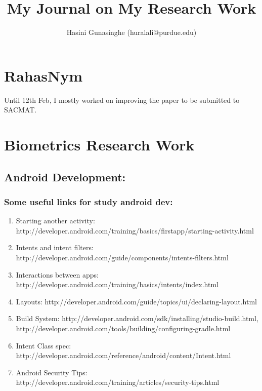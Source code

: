\documentclass[11pt]{article}
\title{
\vspace{-20.mm}
My Journal on My Research Work}
\author{Hasini Gunasinghe (huralali@purdue.edu)}
\date{}
\begin{document}
\maketitle

\section*{RahasNym}
Until 12th Feb, I mostly worked on improving the paper to be submitted to SACMAT.

\pagebreak

\section*{Biometrics Research Work}
\subsection*{Android Development:}

\subsubsection*{Some useful links for study android dev:}
\begin{enumerate}
 \item Starting another activity: http://developer.android.com/training/basics/firstapp/starting-activity.html
 \item Intents and intent filters: http://developer.android.com/guide/components/intents-filters.html
 \item Interactions between apps: http://developer.android.com/training/basics/intents/index.html
 \item Layouts: http://developer.android.com/guide/topics/ui/declaring-layout.html
 \item Build System: http://developer.android.com/sdk/installing/studio-build.html, 
http://developer.android.com/tools/building/configuring-gradle.html
 \item Intent Class spec: http://developer.android.com/reference/android/content/Intent.html
 \item Android Security Tips: http://developer.android.com/training/articles/security-tips.html
\end{enumerate}
\end{document}
